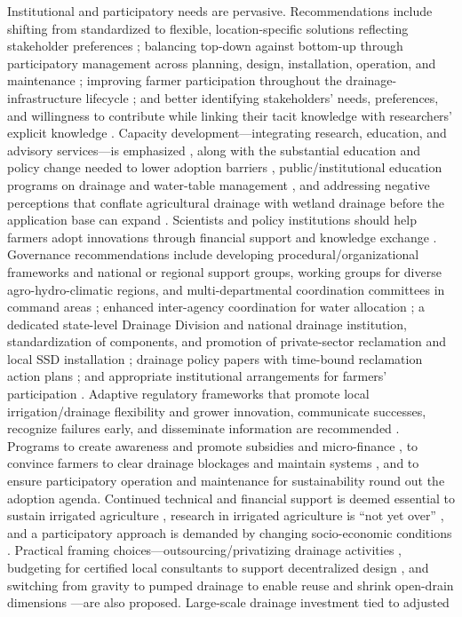 Institutional and participatory needs are pervasive. Recommendations include shifting from standardized to flexible, location-specific solutions reflecting stakeholder preferences \parencite{Ritzema2011,Ritzema2016,Ritzema2023}; balancing top-down against bottom-up through participatory management across planning, design, installation, operation, and maintenance \parencite{Ritzema2016}; improving farmer participation throughout the drainage-infrastructure lifecycle \parencite{Ritzema2023}; and better identifying stakeholders' needs, preferences, and willingness to contribute while linking their tacit knowledge with researchers' explicit knowledge \parencite{Ritzema2011}. Capacity development---integrating research, education, and advisory services---is emphasized \parencite{Ritzema2016}, along with the substantial education and policy change needed to lower adoption barriers \parencite{Castellano2019}, public/institutional education programs on drainage and water-table management \parencite{SHIRMOHAMMADI1995}, and addressing negative perceptions that conflate agricultural drainage with wetland drainage before the application base can expand \parencite{THOMAS1995}. Scientists and policy institutions should help farmers adopt innovations through financial support and knowledge exchange \parencite{Kesicka2023b}. Governance recommendations include developing procedural/organizational frameworks and national or regional support groups, working groups for diverse agro-hydro-climatic regions, and multi-departmental coordination committees in command areas \parencite{Singh2019c}; enhanced inter-agency coordination for water allocation \parencite{Qureshi2008}; a dedicated state-level Drainage Division and national drainage institution, standardization of components, and promotion of private-sector reclamation and local SSD installation \parencite{Gopalakrishnan2007}; drainage policy papers with time-bound reclamation action plans \parencite{Ritzema2008b,Valipour2014}; and appropriate institutional arrangements for farmers' participation \parencite{Ritzema2008b}. Adaptive regulatory frameworks that promote local irrigation/drainage flexibility and grower innovation, communicate successes, recognize failures early, and disseminate information are recommended \parencite{Quinn2009}. Programs to create awareness and promote subsidies and micro-finance \parencite{Satyanarayana2007}, to convince farmers to clear drainage blockages and maintain systems \parencite{Manjunatha2004}, and to ensure participatory operation and maintenance for sustainability \parencite{Gopalakrishnan2007} round out the adoption agenda. Continued technical and financial support is deemed essential to sustain irrigated agriculture \parencite{Qureshi2008}, research in irrigated agriculture is ``not yet over'' \parencite{Ritzema2007}, and a participatory approach is demanded by changing socio-economic conditions \parencite{Ritzema2007}. Practical framing choices---outsourcing/privatizing drainage activities \parencite{AbdelDayem2007}, budgeting for certified local consultants to support decentralized design \parencite{Ritzema2023}, and switching from gravity to pumped drainage to enable reuse and shrink open-drain dimensions \parencite{Ritzema2023}---are also proposed. Large-scale drainage investment tied to adjusted 